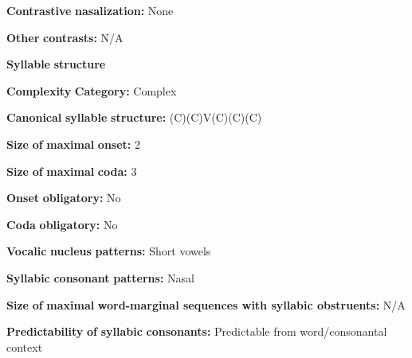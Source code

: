 \documentclass[output=paper]{langsci/langscibook}
\begin{document}
\begin{styleBody}
\textbf{Contrastive} \textbf{nasalization:} None
\end{styleBody}

\begin{styleBody}
\textbf{Other} \textbf{contrasts:} N/A
\end{styleBody}

\begin{styleBody}
\textbf{Syllable} \textbf{structure}
\end{styleBody}

\begin{styleBody}
\textbf{Complexity} \textbf{Category:} Complex
\end{styleBody}

\begin{styleBody}
\textbf{Canonical} \textbf{syllable} \textbf{structure:} (C)(C)V(C)(C)(C) \citep[80-4]{Georg2007}
\end{styleBody}

\begin{styleBody}
\textbf{Size} \textbf{of} \textbf{maximal} \textbf{onset:} 2
\end{styleBody}

\begin{styleBody}
\textbf{Size} \textbf{of} \textbf{maximal} \textbf{coda:} 3
\end{styleBody}

\begin{styleBody}
\textbf{Onset} \textbf{obligatory:} No
\end{styleBody}

\begin{styleBody}
\textbf{Coda} \textbf{obligatory:} No
\end{styleBody}

\begin{styleBody}
\textbf{Vocalic} \textbf{nucleus} \textbf{patterns:} Short vowels
\end{styleBody}

\begin{styleBody}
\textbf{Syllabic} \textbf{consonant} \textbf{patterns:} Nasal
\end{styleBody}

\begin{styleBody}
\textbf{Size} \textbf{of} \textbf{maximal} \textbf{word{}-marginal sequences with syllabic obstruents:} N/A
\end{styleBody}

\begin{styleBody}
\textbf{Predictability} \textbf{of} \textbf{syllabic} \textbf{consonants:} Predictable from word/consonantal context
\end{styleBody}
\end{document}

